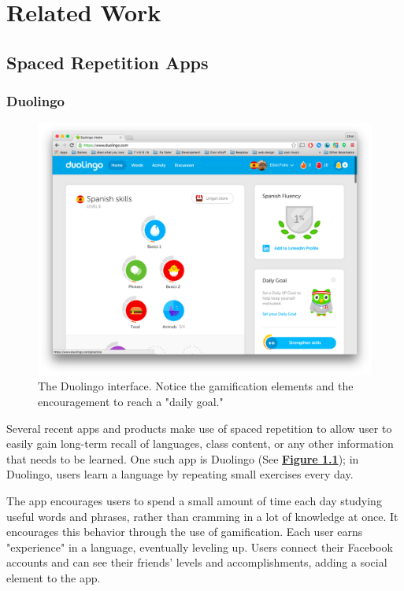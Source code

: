 \chapter{Related Work}

\section{Spaced Repetition Apps}
\subsection{Duolingo}

\begin{figure}
	\centerline{\includegraphics[width=1.2\linewidth]{duolingo}}
	\caption[Duolingo]{The Duolingo interface. Notice the gamification elements and the encouragement to reach a "daily goal."}
	\label{fig:duolingo}
\end{figure}

\par Several recent apps and products make use of spaced repetition to allow user to easily gain long-term recall of languages, class content, or any other information that needs to be learned. One such app is Duolingo (See \textbf{\hyperref[fig:duolingo]{Figure \ref*{fig:duolingo}}}); in Duolingo, users learn a language by repeating small exercises every day. 

\par The app encourages users to spend a small amount of time each day studying useful words and phrases, rather than cramming in a lot of knowledge at once. It encourages this behavior through the use of gamification. Each user earns "experience" in a language, eventually leveling up. Users connect their Facebook accounts and can see their friends' levels and accomplishments, adding a social element to the app. %

